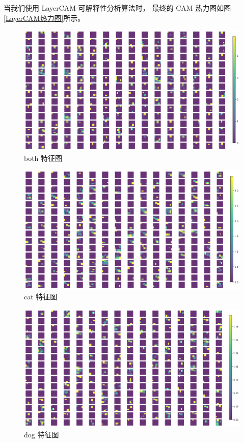 \documentclass[supercite]{Experimental_Report}
\theoremstyle{definition}
\begin{document}
当我们使用 LayerCAM 可解释性分析算法时，
最终的 CAM 热力图如图 \ref{LayerCAM热力图}所示。
\begin{figure}[H]
	\begin{center}
		\includegraphics[scale=0.35]{../images/feature-map0.png}
		\caption{both 特征图}
		\label{特征图1}
	\end{center}
\end{figure}
\begin{figure}[H]
	\begin{center}
		\includegraphics[scale=0.35]{../images/feature-map1.png}
		\caption{cat 特征图}
		\label{特征图2}
	\end{center}
\end{figure}
\begin{figure}[H]
	\begin{center}
		\includegraphics[scale=0.35]{../images/feature-map2.png}
		\caption{dog 特征图}
		\label{特征图3}
	\end{center}
\end{figure}
\end{document}
